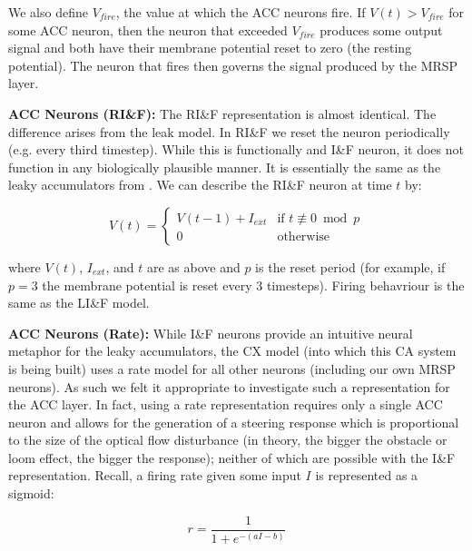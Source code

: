 \documentclass[a4paper,11pt,twoside,openright]{article}
\begin{document}
We also define $V_{fire}$, the value at which the ACC neurons fire.
If $V(t) > V_{fire}$ for some ACC neuron, then the neuron that exceeded
$V_{fire}$ produces some output signal and both have their membrane potential
reset to zero (the resting potential). The neuron that fires then governs the
signal produced by the MRSP layer.
\newline\par

\textbf{ACC Neurons (RI\&F):}
The RI\&F representation is almost identical. The difference arises from the leak
model. In RI\&F we reset the neuron periodically (e.g. every third timestep).
While this is functionally and I\&F neuron, it does not function in any
biologically plausible manner. It is essentially the same as the leaky
accumulators from \cite{Mitchell2018}. We can describe the RI\&F neuron at time
$t$ by:

\begin{equation}
  V(t) =
  \begin{cases}
    V(t-1) + I_{ext} & \text{if } t \not\equiv 0 \bmod p \\
    0 & \text{otherwise}
  \end{cases}
\end{equation}

where $V(t)$, $I_{ext}$, and $t$ are as above and $p$ is the reset period (for
example, if $p = 3$ the membrane potential is reset every 3 timesteps). Firing
behavriour is the same as the LI\&F model.
\newline\par

\textbf{ACC Neurons (Rate):}
While I\&F neurons provide an intuitive neural metaphor for the leaky
accumulators, the CX model (into which this CA system is being built) uses
a rate model for all other neurons (including our own MRSP neurons). As such we
felt it appropriate to investigate such a representation for the ACC layer. In
fact, using a rate representation requires only a single ACC neuron and allows
for the generation of a steering response which is proportional to the size of
the optical flow disturbance (in theory, the bigger the obstacle or loom effect,
the bigger the response); neither of which are possible with the I\&F
representation. Recall, a firing rate given some input $I$ is represented as a
sigmoid:

\begin{equation}
r = \frac{1}{1 + e^{-(aI - b)}}
\end{equation}
\end{document}
